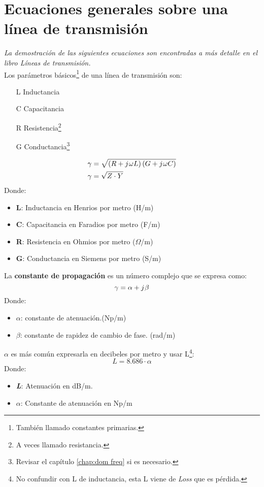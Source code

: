 \documentclass[
	12pt, %
	fleqn, %
	a4paper, %
	oneside, %
]{LegrandOrangeBook}
\begin{document}
\section{Ecuaciones generales sobre una línea de transmisión}
\emph{La demostración de las siguientes ecuaciones son encontradas a más detalle en el libro \textit{Líneas de transmisión\cite{velalineas1999}.}}\\
Los parámetros básicos\footnote{También llamado constantes primarias.} de una línea de transmisión son:
\begin{enumerate}
\item[L] Inductancia
\item[C] Capacitancia
\item[R] Resistencia\footnote{A veces llamado resistancia.}
\item[G] Conductancia\footnote{Revisar el capítulo \ref{chap:dom freq} si es necesario.}
\end{enumerate}
\begin{definition}
\begin{align}
\gamma &=\sqrt{\left(R+{j\mkern1mu}\omega L\right)\left(G+{j\mkern1mu}\omega  C\right)}\\
\gamma &=\sqrt{Z\cdot Y}
\label{eq:cons propag}
\end{align}
Donde:
\begin{itemize}
\item \textbf{L}: Inductancia en Henrios por metro (H/m)
\item \textbf{C}: Capacitancia en Faradios por metro (F/m)
\item \textbf{R}: Resistencia en Ohmios por metro ($\Omega$/m)
\item \textbf{G}: Conductancia en Siemens por metro (S/m)
\end{itemize}
La \textbf{constante de propagación} es un número complejo que se expresa como:
\begin{equation}
\gamma=\alpha+{j\mkern1mu}\beta
\label{eq:cont prop alpha beta}
\end{equation}
Donde:
\begin{itemize}
\item $\alpha$: constante de atenuación.(Np/m)
\item $\beta$: constante de rapidez de cambio de fase. (rad/m)
\end{itemize}
$\alpha$ es más común expresarla en decibeles por metro y usar L\footnote{No confundir con L de inductancia, esta L viene de \textit{Loss} que es pérdida.}:
\begin{equation}
\textit{L}=8.686\cdot\alpha
\label{eq:np a db}
\end{equation}
Donde:
\begin{itemize}
\item \textbf{\textit{L}}: Atenuación en dB/m.
\item $\alpha$: Constante de atenuación en Np/m
\end{itemize}
\end{definition}
\end{document}
